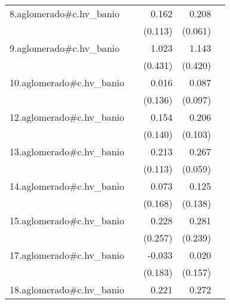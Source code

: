 {\begin{longtable}{l*{4}{D{.}{.}{-1}}}
\addlinespace
8.aglomerado#c.hv\_banio&                     &       0.162         &       0.208\sym{***}&                     \\
            &                     &     (0.113)         &     (0.061)         &                     \\
\addlinespace
9.aglomerado#c.hv\_banio&                     &       1.023\sym{*}  &       1.143\sym{**} &                     \\
            &                     &     (0.431)         &     (0.420)         &                     \\
\addlinespace
10.aglomerado#c.hv\_banio&                     &       0.016         &       0.087         &                     \\
            &                     &     (0.136)         &     (0.097)         &                     \\
\addlinespace
12.aglomerado#c.hv\_banio&                     &       0.154         &       0.206\sym{*}  &                     \\
            &                     &     (0.140)         &     (0.103)         &                     \\
\addlinespace
13.aglomerado#c.hv\_banio&                     &       0.213         &       0.267\sym{***}&                     \\
            &                     &     (0.113)         &     (0.059)         &                     \\
\addlinespace
14.aglomerado#c.hv\_banio&                     &       0.073         &       0.125         &                     \\
            &                     &     (0.168)         &     (0.138)         &                     \\
\addlinespace
15.aglomerado#c.hv\_banio&                     &       0.228         &       0.281         &                     \\
            &                     &     (0.257)         &     (0.239)         &                     \\
\addlinespace
17.aglomerado#c.hv\_banio&                     &      -0.033         &       0.020         &                     \\
            &                     &     (0.183)         &     (0.157)         &                     \\
\addlinespace
18.aglomerado#c.hv\_banio&                     &       0.221         &       0.272\sym{***}&                     \\

\end{longtable}}

